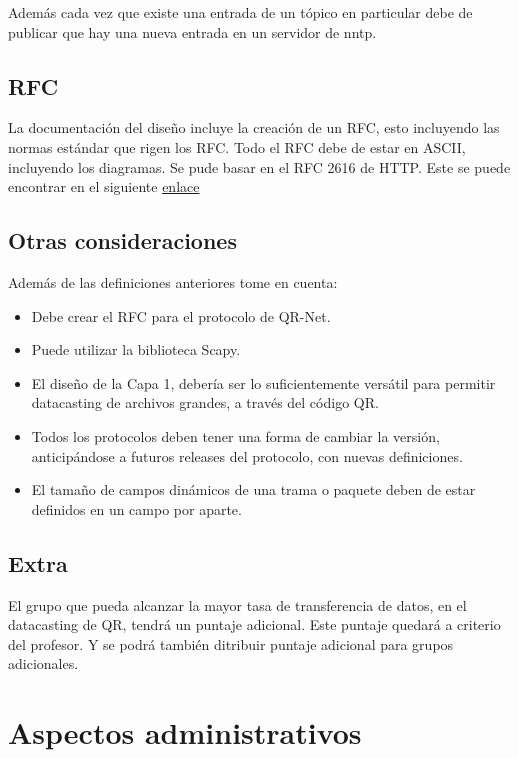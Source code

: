 \documentclass{article}
\providecommand{\tightlist}{%
          \setlength{\itemsep}{0pt}\setlength{\parskip}{0pt}}
\begin{document}
Además cada vez que existe una entrada de un tópico en particular debe
de publicar que hay una nueva entrada en un servidor de nntp.

\subsection{RFC}\label{rfc}

La documentación del diseño incluye la creación de un RFC, esto
incluyendo las normas estándar que rigen los RFC. Todo el RFC debe de
estar en ASCII, incluyendo los diagramas. Se pude basar en el RFC 2616
de HTTP. Este se puede encontrar en el siguiente
\href{http://www.w3.org/Protocols/rfc2616/rfc2616.txt}{enlace}

\subsection{Otras consideraciones}\label{otras-consideraciones}

Además de las definiciones anteriores tome en cuenta:

\begin{itemize}
\tightlist
\item
  Debe crear el RFC para el protocolo de QR-Net.
\item
  Puede utilizar la biblioteca Scapy.
\item
  El diseño de la Capa 1, debería ser lo suficientemente versátil para
  permitir datacasting de archivos grandes, a través del código QR.
\item
  Todos los protocolos deben tener una forma de cambiar la versión,
  anticipándose a futuros releases del protocolo, con nuevas
  definiciones.
\item
  El tamaño de campos dinámicos de una trama o paquete deben de estar
  definidos en un campo por aparte.
\end{itemize}

\subsection{Extra}\label{extra}

El grupo que pueda alcanzar la mayor tasa de transferencia de datos, en
el datacasting de QR, tendrá un puntaje adicional. Este puntaje quedará
a criterio del profesor. Y se podrá también ditribuir puntaje adicional
para grupos adicionales.

\section{Aspectos administrativos}\label{administrativo}
\end{document}
